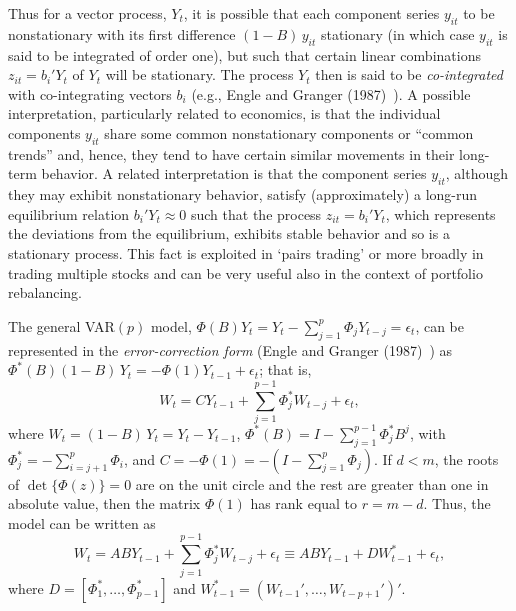 Thus for a vector process, $Y_t$, it is possible that each component series $y_{it}$ to be nonstationary with its first difference $(1 - B)\, y_{it}$ stationary (in which case $y_{it}$ is said to be integrated of order one), but such that certain linear combinations $z_{it} = b_i' Y_t $ of $Y_t$ will be stationary. The process $Y_t$ then is said to be \emph{co-integrated} with co-integrating vectors $b_i$ (e.g., Engle and Granger (1987)~\cite{engle1987co}).  A possible interpretation, particularly related to economics, is that the individual components $y_{it}$ share some common nonstationary components or ``common trends'' and, hence, they tend to have certain similar movements in their long-term behavior.  A related interpretation is that the component series $y_{it}$, although they may exhibit nonstationary behavior, satisfy (approximately) a long-run equilibrium relation $b_i' Y_t \approx 0$ such that the process $z_{it} = b_i' Y_t$, which represents the deviations from the equilibrium, exhibits stable behavior and so is a stationary process. This fact is exploited in `pairs trading' or more broadly in trading multiple stocks and can be very useful also in the context of portfolio rebalancing. 


The general VAR$(p)$ model, $\Phi(B) Y_t = Y_t - \sum_{j=1}^p \Phi_j Y_{t-j} = \epsilon_t$, can be represented in the  \emph{error-correction form} (Engle and Granger (1987)~\cite{engle1987co}) as $\Phi^*(B) (1 - B)\, Y_t = - \Phi (1) Y_{t-1} + \epsilon_t$; that is,
	\begin{equation} \label{eqn:2WtCt}
	W_t = C Y_{t-1} + \sum_{j=1}^{p-1} \Phi_j^* W_{t-j} + \epsilon_t ,
	\end{equation}
where $W_t = (1 - B)\, Y_t = Y_t - Y_{t-1}$, $\Phi^*(B) = I - \sum_{j=1}^{p-1} \Phi_j^* B^j $, with $\Phi_j^* = - \sum_{i= j+1}^p \Phi_i$, and $C = - \Phi (1) = - (I - \sum_{j=1}^p \Phi_j)$. If $d < m$, the roots of $\det \{ \Phi(z) \}= 0$ are on the unit circle and the rest are greater than one in absolute value, then the matrix $\Phi(1)$ has rank equal to $r= m - d$. Thus, the model can be written as
	\begin{equation} \label{eqn:2WtABY}
	W_t = ABY_{t-1} + \sum_{j=1}^{p-1} \Phi_j^* W_{t-j} + \epsilon_t \equiv ABY_{t-1} + DW_{t-1}^* + \epsilon_t , 
	\end{equation}
where $D = [\Phi_1^* ,\ldots,\Phi_{p-1}^* ]$ and $W_{t-1}^* = (W_{t-1}', \ldots, W_{t-p+1}' )'$.


